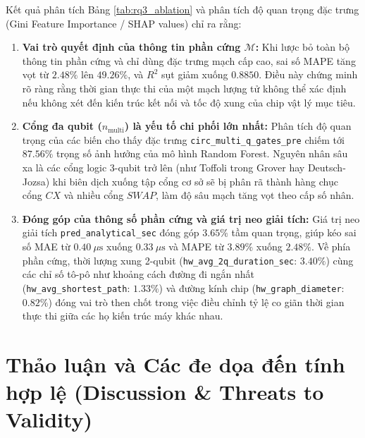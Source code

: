 \documentclass[11pt, a4paper]{article}
\begin{document}
\noindent Kết quả phân tích Bảng \ref{tab:rq3_ablation} và phân tích độ quan trọng đặc trưng (Gini Feature Importance / SHAP values) chỉ ra rằng:
\begin{enumerate}
    \item \textbf{Vai trò quyết định của thông tin phần cứng $\mathcal{M}$:} Khi lược bỏ toàn bộ thông tin phần cứng và chỉ dùng đặc trưng mạch cấp cao, sai số MAPE tăng vọt từ $2.48\%$ lên $49.26\%$, và $R^2$ sụt giảm xuống $0.8850$. Điều này chứng minh rõ ràng rằng thời gian thực thi của một mạch lượng tử không thể xác định nếu không xét đến kiến trúc kết nối và tốc độ xung của chip vật lý mục tiêu.
    \item \textbf{Cổng đa qubit ($n_{\text{multi}}$) là yếu tố chi phối lớn nhất:} Phân tích độ quan trọng của các biến cho thấy đặc trưng \texttt{circ\_multi\_q\_gates\_pre} chiếm tới \textbf{$87.56\%$} trọng số ảnh hưởng của mô hình Random Forest. Nguyên nhân sâu xa là các cổng logic 3-qubit trở lên (như Toffoli trong Grover hay Deutsch-Jozsa) khi biên dịch xuống tập cổng cơ sở sẽ bị phân rã thành hàng chục cổng $CX$ và nhiều cổng $SWAP$, làm độ sâu mạch tăng vọt theo cấp số nhân.
    \item \textbf{Đóng góp của thông số phần cứng và giá trị neo giải tích:} Giá trị neo giải tích \texttt{pred\_analytical\_sec} đóng góp $3.65\%$ tầm quan trọng, giúp kéo sai số MAE từ $0.40~\mu\text{s}$ xuống $0.33~\mu\text{s}$ và MAPE từ $3.89\%$ xuống $2.48\%$. Về phía phần cứng, thời lượng xung 2-qubit (\texttt{hw\_avg\_2q\_duration\_sec}: $3.40\%$) cùng các chỉ số tô-pô như khoảng cách đường đi ngắn nhất (\texttt{hw\_avg\_shortest\_path}: $1.33\%$) và đường kính chip (\texttt{hw\_graph\_diameter}: $0.82\%$) đóng vai trò then chốt trong việc điều chỉnh tỷ lệ co giãn thời gian thực thi giữa các họ kiến trúc máy khác nhau.
\end{enumerate}

\section{Thảo luận và Các đe dọa đến tính hợp lệ (Discussion \& Threats to Validity)}
\end{document}
